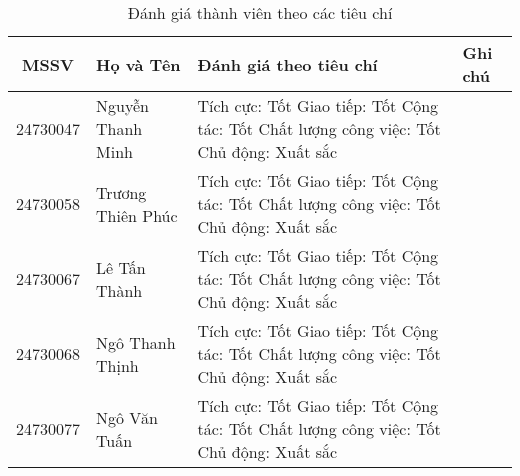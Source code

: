 \documentclass[12pt]{report}
\begin{document}
\begin{table}[h!]
    \centering
    \begin{tabular}{|c|p{120pt}|p{160pt}|p{80pt}|}
        \hline
        \textbf{MSSV}      & \textbf{Họ và Tên} & \textbf{Đánh giá theo tiêu chí} & \textbf{Ghi chú} \\
        \hline
        24730047           & Nguyễn Thanh Minh  &
        Tích cực: Tốt \newline
        Giao tiếp: Tốt \newline
        Cộng tác: Tốt \newline
        Chất lượng công việc: Tốt \newline
        Chủ động: Xuất sắc &                                                                         \\
        \hline
        24730058           & Trương Thiên Phúc  &
        Tích cực: Tốt \newline
        Giao tiếp: Tốt \newline
        Cộng tác: Tốt \newline
        Chất lượng công việc: Tốt \newline
        Chủ động: Xuất sắc &                                                                         \\
        \hline
        24730067           & Lê Tấn Thành       &
        Tích cực: Tốt \newline
        Giao tiếp: Tốt \newline
        Cộng tác: Tốt \newline
        Chất lượng công việc: Tốt \newline
        Chủ động: Xuất sắc &                                                                         \\
        \hline
        24730068           & Ngô Thanh Thịnh    &
        Tích cực: Tốt \newline
        Giao tiếp: Tốt \newline
        Cộng tác: Tốt \newline
        Chất lượng công việc: Tốt \newline
        Chủ động: Xuất sắc &                                                                         \\
        \hline
        24730077           & Ngô Văn Tuấn       &
        Tích cực: Tốt \newline
        Giao tiếp: Tốt \newline
        Cộng tác: Tốt \newline
        Chất lượng công việc: Tốt \newline
        Chủ động: Xuất sắc &                                                                         \\
        \hline
    \end{tabular}
    \caption{Đánh giá thành viên theo các tiêu chí}
    \label{tab:member_ratings}
\end{table}
\end{document}
